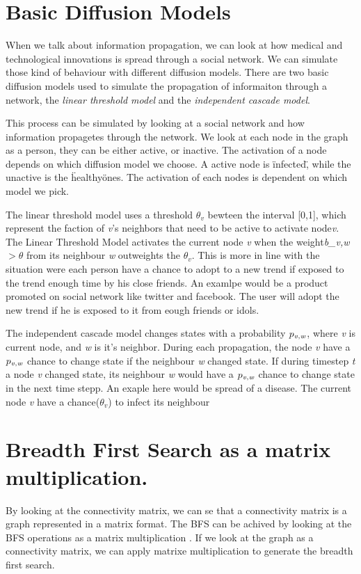 \section{Basic Diffusion Models}
When we talk about information propagation, we can look at how medical and technological innovations is spread through a social network. We can simulate those kind of behaviour with different diffusion models. There are two basic diffusion models used to simulate the propagation of informaiton through a network\cite{kempe}, the {\it linear threshold model} and the {\it independent cascade model}\cite{kempe}.

This process can be simulated by looking at a social network and how information propagetes through the network. We look at each node in the graph as a person, they can be either active, or inactive. The activation of a node depends on which diffusion model we choose. A active node is \"infected\", while the unactive is the \"healthy\" ones. The activation of each nodes is dependent on which model we pick.

The linear threshold model uses a threshold $\theta_v$ bewteen the interval [0,1], which represent the faction of {\it v}'s neighbors that need to be active to activate node{\it v}. The Linear Threshold Model activates the current node {\it v} when the weight{\it b_{v,w}} $> \theta$ from its neighbour {\it w} outweights the $\theta_v$. This is more in line with the situation were each person have a chance to adopt to a new trend if exposed to the trend enough time by his close friends. An examlpe would be a product promoted on social network like twitter and facebook. The user will adopt the new trend if he is exposed to it from eough friends or idols. 

The independent cascade model changes states with a probability $p_{\it v, w}$, where {\it v }is current node, and {\it w} is it's neighbor. During each propagation, the node {\it v} have a  $p_{\it v, w}$ chance to change state if the neighbour {\it w} changed state. If during timestep {\it t} a node {\it v} changed state, its neighbour {\it w} would have a  $p_{\it v, w}$ chance to change state in the next time stepp. An exaple here would be spread of a disease. The current node {\it v} have a chance($\theta_v$) to infect its neighbour

\section{Breadth First Search as a matrix multiplication.}
By looking at the 	connectivity matrix, we can se that a connectivity matrix is a graph represented in a matrix format. The BFS can be achived by looking at the BFS operations as a matrix multiplication \cite{algoToMath}. If we look at the graph as a connectivity matrix, we can apply matrixe multiplication to generate the breadth first search. 

